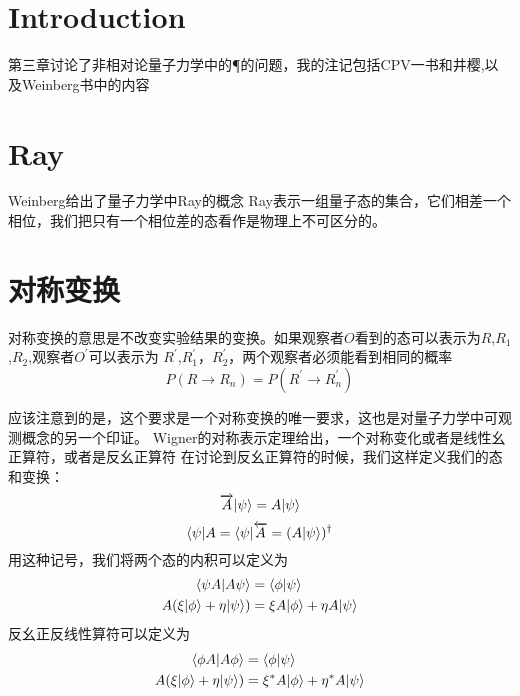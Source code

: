\section{Introduction}
第三章讨论了非相对论量子力学中的\C \P \T 的问题，我的注记包括CPV一书和井樱,以及Weinberg书中的内容

\section{Ray}
Weinberg给出了量子力学中Ray的概念
Ray表示一组量子态的集合，它们相差一个相位，我们把只有一个相位差的态看作是物理上不可区分的。

\section{对称变换}
对称变换的意思是不改变实验结果的变换。如果观察者$O$看到的态可以表示为$R$,$R_1$,$R_2$,观察者$O^\prime$可以表示为
$R^\prime$,$R_1^\prime$，$R_2^\prime$，两个观察者必须能看到相同的概率
\begin{equation}
    P(R\rightarrow R_n) = P(R^\prime\rightarrow R_n^\prime)
\end{equation}

应该注意到的是，这个要求是一个对称变换的唯一要求，这也是对量子力学中可观测概念的另一个印证。
Wigner的对称表示定理给出，一个对称变化或者是线性幺正算符，或者是反幺正算符
在讨论到反幺正算符的时候，我们这样定义我们的态和变换：
\begin{equation}
    \overrightarrow A|\psi\rangle = A|\psi\rangle
\end{equation}
\begin{equation}
    \langle \psi|A = \langle \psi|\overleftarrow A = (A|\psi\rangle)^\dagger
\end{equation}
用这种记号，我们将两个态的内积可以定义为
\begin{align}
    \langle \psi A|A\psi\rangle &= \langle \phi|\psi\rangle \\
    A(\xi|\phi\rangle + \eta|\psi\rangle) &= \xi A|\phi\rangle + \eta A|\psi\rangle
\end{align}
反幺正反线性算符可以定义为
\begin{align}
    \langle \phi A|A\phi\rangle &= \langle \phi|\psi\rangle \\
    A(\xi|\phi\rangle +\eta|\psi\rangle) &= \xi^* A|\phi\rangle + \eta^* A|\psi\rangle
\end{align}

